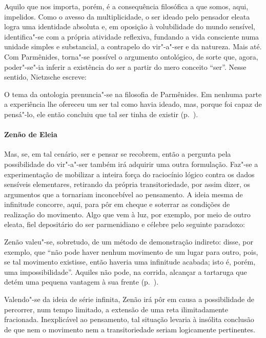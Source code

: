 Aquilo que nos importa,
porém, é a consequência filosófica a que somos, aqui, impelidos. Como o
avesso da multiplicidade, o ser ideado pelo pensador eleata logra uma
identidade absoluta e, em oposição à volubilidade do mundo sensível,
identifica"-se com a própria atividade reflexiva, fundando a vida
consciente numa unidade simples e substancial, a contrapelo do
vir"-a"-ser e da natureza. Mais até. Com Parmênides, torna"-se possível o
argumento ontológico, de sorte que, agora, poder"-se"-ia inferir a
existência do ser a partir do mero conceito ``ser''. Nesse sentido,
Nietzsche escreve: 

\begin{hedraquote} 
O tema da ontologia prenuncia"-se na
filosofia de Parmênides. Em nenhuma parte a experiência lhe ofereceu um
ser tal como havia ideado, mas, porque foi capaz de pensá"-lo, ele então
concluiu que tal ser tinha de existir (p.~\pageref{temadaontologia}).
\end{hedraquote} 

\paragraph{Zenão de Eleia} Mas, se, em tal cenário, ser e pensar se recobrem, então a pergunta pela
possibilidade do vir"-a"-ser também irá adquirir uma outra formulação.
Faz"-se a experimentação de mobilizar a inteira força do raciocínio
lógico contra os dados sensíveis elementares, retirando da própria
transitoriedade, por assim dizer, os argumentos que a tornariam
inconcebível ao pensamento. A ideia mesma de infinitude concorre, aqui,
para pôr em cheque e soterrar as condições de realização do movimento.
Algo que vem à luz, por exemplo, por meio de outro eleata, fiel
depositário do ser parmenidiano e célebre pelo seguinte paradoxo:

\begin{hedraquote} 
Zenão valeu"-se, sobretudo, de um método de demonstração
indireto: disse, por exemplo, que ``não pode haver
nenhum movimento de um lugar para outro, pois, se tal movimento
existisse, então haveria uma infinitude acabada; isto é, porém, uma
impossibilidade''. Aquiles não pode, na corrida,
alcançar a tartaruga que detém uma pequena vantagem à sua
frente (p.~\pageref{zenaovaleuse}).
\end{hedraquote} 

Valendo"-se da
ideia de série infinita, Zenão irá pôr em causa a possibilidade de
percorrer, num tempo limitado, a extensão de uma reta ilimitadamente
fracionada. Inexplicável ao pensamento, tal situação levaria à insólita
conclusão de que nem o movimento nem a transitoriedade seriam
logicamente pertinentes.


